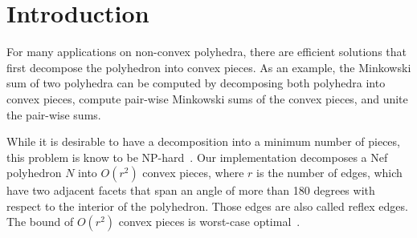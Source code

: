 
\ccParDims


%

\section{Introduction}

For many applications on non-convex polyhedra, there are efficient
solutions that first decompose the polyhedron into convex pieces. As
an example, the Minkowski sum of two polyhedra can be computed by
decomposing both polyhedra into convex pieces, compute pair-wise
Minkowski sums of the convex pieces, and unite the pair-wise sums.

While it is desirable to have a decomposition into a minimum number of
pieces, this problem is know to be NP-hard~\cite{c-cpplb-84}. Our
implementation decomposes a Nef polyhedron $N$ into $O(r^2)$ convex
pieces, where $r$ is the number of edges, which have two adjacent
facets that span an angle of more than 180 degrees with respect to the
interior of the polyhedron. Those edges are also called reflex edges.
The bound of $O(r^2)$ convex pieces is worst-case
optimal~\cite{c-cpplb-84}.

